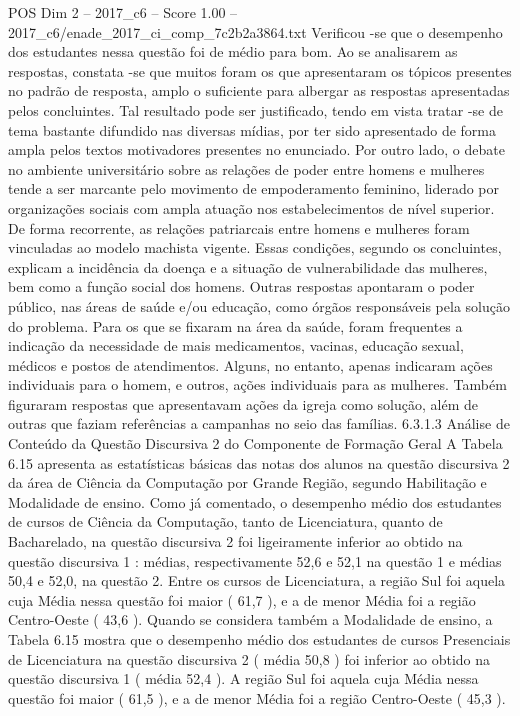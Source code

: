 \begin{textsample}{POS Dim 2 – 2017\_c6 – Score 1.00 – 2017\_c6/enade\_2017\_ci\_comp\_7c2b2a3864.txt}
Verificou -se que o desempenho dos estudantes nessa questão foi de médio para bom.
Ao se analisarem as respostas, constata -se que muitos foram os que apresentaram os tópicos presentes no padrão de resposta, amplo o suficiente para albergar as respostas apresentadas pelos concluintes.
Tal resultado pode ser justificado, tendo em vista tratar -se de tema bastante difundido nas diversas mídias, por ter sido apresentado de forma ampla pelos textos motivadores presentes no enunciado.
Por outro lado, o debate no ambiente universitário sobre as relações de poder entre homens e mulheres tende a ser marcante pelo movimento de empoderamento feminino, liderado por organizações sociais com ampla atuação nos estabelecimentos de nível superior.
De forma recorrente, as relações patriarcais entre homens e mulheres foram vinculadas ao modelo machista vigente.
Essas condições, segundo os concluintes, explicam a incidência da doença e a situação de vulnerabilidade das mulheres, bem como a função social dos homens.
Outras respostas apontaram o poder público, nas áreas de saúde e/ou educação, como órgãos responsáveis pela solução do problema.
Para os que se fixaram na área da saúde, foram frequentes a indicação da necessidade de mais medicamentos, vacinas, educação sexual, médicos e postos de atendimentos.
Alguns, no entanto, apenas indicaram ações individuais para o homem, e outros, ações individuais para as mulheres.
Também figuraram respostas que apresentavam ações da igreja como solução, além de outras que faziam referências a campanhas no seio das famílias. 6.3.1.3 Análise de Conteúdo da Questão Discursiva 2 do Componente de Formação Geral A Tabela 6.15 apresenta as estatísticas básicas das notas dos alunos na questão discursiva 2 da área de Ciência da Computação por Grande Região, segundo Habilitação e Modalidade de ensino.
Como já comentado, o desempenho médio dos estudantes de cursos de Ciência da Computação, tanto de Licenciatura, quanto de Bacharelado, na questão discursiva 2 foi ligeiramente inferior ao obtido na questão discursiva 1 : médias, respectivamente 52,6 e 52,1 na questão 1 e médias 50,4 e 52,0, na questão 2.
Entre os cursos de Licenciatura, a região Sul foi aquela cuja Média nessa questão foi maior ( 61,7 ), e a de menor Média foi a região Centro-Oeste ( 43,6 ).
Quando se considera também a Modalidade de ensino, a Tabela 6.15 mostra que o desempenho médio dos estudantes de cursos Presenciais de Licenciatura na questão discursiva 2 ( média 50,8 ) foi inferior ao obtido na questão discursiva 1 ( média 52,4 ).
A região Sul foi aquela cuja Média nessa questão foi maior ( 61,5 ), e a de menor Média foi a região Centro-Oeste ( 45,3 ).

\end{textsample}
